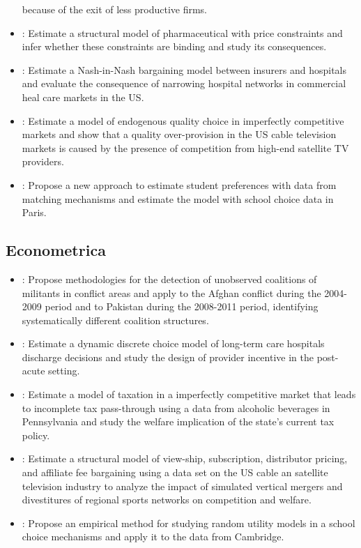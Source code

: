 \documentclass[]{book}
\begin{document}
\begin{itemize}
  because of the exit of less productive firms.
\item
  \citet{duboisIdentifyingIndustryMargins2018}: Estimate a structural
  model of pharmaceutical with price constraints and infer whether these
  constraints are binding and study its consequences.
\item
  \citet{hoEquilibriumProviderNetworks2019}: Estimate a Nash-in-Nash
  bargaining model between insurers and hospitals and evaluate the
  consequence of narrowing hospital networks in commercial heal care
  markets in the US.
\item
  \citet{crawfordQualityOverprovisionCable2019}: Estimate a model of
  endogenous quality choice in imperfectly competitive markets and show
  that a quality over-provision in the US cable television markets is
  caused by the presence of competition from high-end satellite TV
  providers.
\item
  \citet{fackTruthTellingPreferenceEstimation2019}: Propose a new
  approach to estimate student preferences with data from matching
  mechanisms and estimate the model with school choice data in Paris.
\end{itemize}

\subsection{Econometrica}\label{econometrica}

\begin{itemize}
\item
  \citet{trebbiInsurgencySmallWars2019}: Propose methodologies for the
  detection of unobserved coalitions of militants in conflict areas and
  apply to the Afghan conflict during the 2004-2009 period and to
  Pakistan during the 2008-2011 period, identifying systematically
  different coalition structures.
\item
  \citet{einavProviderIncentivesHealthcare2018}: Estimate a dynamic
  discrete choice model of long-term care hospitals discharge decisions
  and study the design of provider incentive in the post-acute setting.
\item
  \citet{miraveteMarketPowerLaffer2018}: Estimate a model of taxation in
  a imperfectly competitive market that leads to incomplete tax
  pass-through using a data from alcoholic beverages in Pennsylvania and
  study the welfare implication of the state's current tax policy.
\item
  \citet{crawfordWelfareEffectsVertical2018}: Estimate a structural
  model of view-ship, subscription, distributor pricing, and affiliate
  fee bargaining using a data set on the US cable an satellite
  television industry to analyze the impact of simulated vertical
  mergers and divestitures of regional sports networks on competition
  and welfare.
\item
  \citet{agarwalDemandAnalysisUsing2018}: Propose an empirical method
  for studying random utility models in a school choice mechanisms and
  apply it to the data from Cambridge.
\end{itemize}
\end{document}
